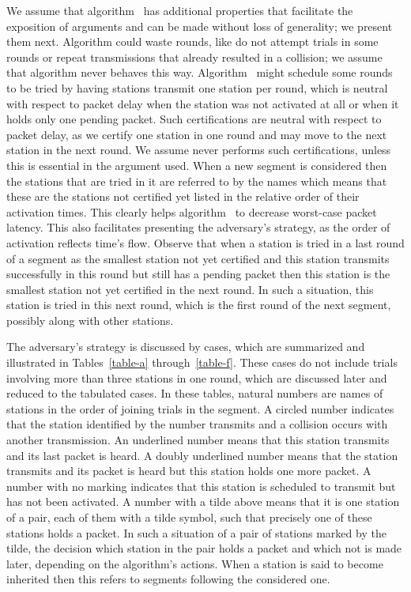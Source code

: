 \documentclass[11pt]{article}
\begin{document}
We assume that algorithm~ has additional properties that facilitate the exposition of arguments and can be made without loss of generality; we present them next.
Algorithm  could waste rounds, like do not attempt trials  in some rounds  or repeat transmissions that already resulted in a collision; we assume that algorithm  never behaves this way.
Algorithm~ might schedule some rounds to be tried by having stations transmit one station per round, which is neutral with respect to packet delay when the station was not activated at all or when it holds only one pending packet.
Such certifications are neutral with respect to packet delay, as we certify one station in one round and may move to the next station in the next round.
We assume  never performs such certifications, unless this is essential in the argument used.
When a new segment is considered then the stations that are tried in it are referred to by the names  which means that these are the stations not certified yet listed in the relative order of their activation times.
This clearly helps algorithm~ to decrease worst-case packet latency.
This also facilitates presenting the adversary's strategy, as the order of activation reflects time's flow.
Observe that when a station is tried in a last round of a segment as the smallest station not yet certified and this station transmits successfully in this round but still has a pending packet then this station is the smallest station not yet certified in the next round.
In such a situation, this station is tried in this next round, which is the first round of the next segment, possibly along with other stations.


The adversary's strategy is discussed by cases, which are summarized and illustrated in Tables~\ref{table-a} through~\ref{table-f}.
These cases do not include trials involving more than three stations in one round, which are discussed later and reduced to the tabulated cases.
In these tables, natural numbers are names of stations in the order of joining trials in the segment.
A circled number indicates that the station identified by the number transmits and a collision occurs with another transmission.
An underlined number means  that this station transmits and its last packet is heard.
A doubly underlined number means that the station transmits and its packet is heard but this station holds one more packet.
A number with no marking indicates that this station is scheduled to transmit but has not been activated.
A number with a tilde above means that it is one station of a pair, each of them with a tilde symbol, such that precisely one of these stations holds a packet.
In such a situation of a pair of stations marked by the tilde, the decision which station in the pair holds a packet and which not is made later, depending on the algorithm's actions.
When a station is said to become inherited then this refers to segments following the considered one.
\end{document}
